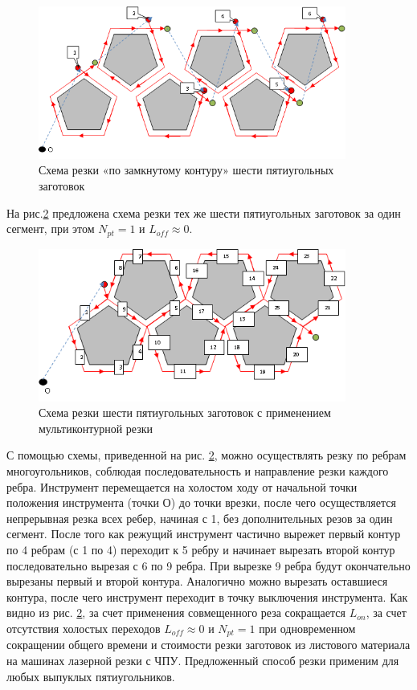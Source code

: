 \documentclass[12pt]{report}
\begin{document}
\begin{figure}
  \begin{center}
  \includegraphics[width=0.9\textwidth]{5-6.png}
  \caption{Схема резки «по замкнутому контуру» шести пятиугольных заготовок}
  \label{5-6}
  \end{center}
\end{figure}

На рис.\ref{5-1}
предложена схема резки тех же шести
пятиугольных заготовок за один сегмент, при этом  $N_{pt}=1$
и $L_{off} \approx 0$.

\begin{figure}
  \begin{center}
  \includegraphics[width=0.9\textwidth]{5-1.png}
  \caption{Схема резки шести пятиугольных заготовок
  с применением мультиконтурной резки}
  \label{5-1}
  \end{center}
\end{figure}

С помощью схемы, приведенной на рис. \ref{5-1},
можно осуществлять резку по ребрам многоугольников,
соблюдая последовательность и направление резки каждого ребра.
Инструмент перемещается на холостом ходу от
начальной точки положения инструмента
(точки О)
до точки врезки, после чего осуществляется непрерывная резка всех ребер,
начиная с 1, без дополнительных резов за один сегмент.
После того как режущий инструмент частично вырежет
первый контур по 4 ребрам (с 1 по 4)
переходит к 5 ребру и начинает вырезать
второй контур последовательно вырезая с 6 по 9 ребра.
При вырезке 9 ребра будут окончательно
вырезаны первый и второй контура.
Аналогично можно вырезать оставшиеся контура,
после чего инструмент переходит в точку выключения инструмента.
Как видно из рис. \ref{5-1},
за счет применения совмещенного реза сокращается $L_{on}$,
за счет отсутствия холостых переходов
$L_{off} \approx 0$
и $N_{pt}=1$
при одновременном сокращении общего времени
и стоимости резки заготовок из листового
материала на машинах лазерной резки с ЧПУ.
Предложенный способ резки применим для любых выпуклых пятиугольников.
\end{document}
